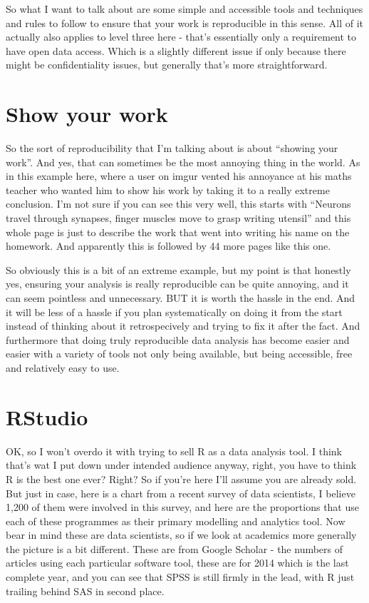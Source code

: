 \documentclass[12pt]{article}
\begin{document}
So what I want to talk about are some simple and accessible tools and techniques and rules to follow to ensure that your work is reproducible in this sense. All of it actually also applies to level three here - that's essentially only a requirement to have open data access. Which is a slightly different issue if only because there might be confidentiality issues, but generally that's more straightforward. 


\section{Show your work}
So the sort of reproducibility that I'm talking about is about ``showing your work''. And yes, that can sometimes be the most annoying thing in the world. As in this example here, where a user on imgur vented his annoyance at his maths teacher who wanted him to show his work by taking it to a really extreme conclusion. I'm not sure if you can see this very well, this starts with ``Neurons travel through synapses, finger muscles move to grasp writing utensil'' and this whole page is just to describe the work that went into writing his name on the homework. And apparently this is followed by 44 more pages like this one. 

So obviously this is a bit of an extreme example, but my point is that honestly yes, ensuring your analysis is really reproducible can be quite annoying, and it can seem pointless and unnecessary.  BUT it is worth the hassle in the end. And it will be less of a hassle if you plan systematically on doing it from the start instead of thinking about it retrospecively and trying to fix it after the fact. And furthermore that doing truly reproducible data analysis has become easier and easier with a variety of tools not only being available, but being accessible, free and relatively easy to use. 

\section{RStudio}
OK, so I won't overdo it with trying to sell R as a data analysis tool. I think that's wat I put down under intended audience anyway, right, you have to think R is the best one ever? Right? So if you're here I'll assume you are already sold. But just in case, here is a chart from a recent survey of data scientists, I believe 1,200 of them were involved in this survey, and here are the proportions that use each of these programmes as their primary modelling and analytics tool. Now bear in mind these are data scientists, so if we look at academics more generally the picture is a bit different. These are from Google Scholar - the numbers of articles using each particular software tool, these are for 2014 which is the last complete year, and you can see that SPSS is still firmly in the lead, with R just trailing behind SAS in second place. 
\end{document}

